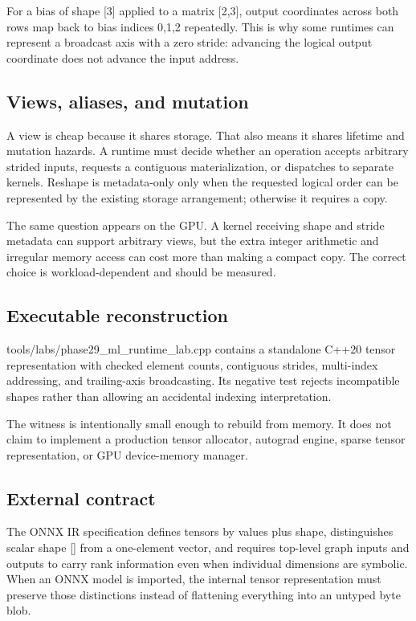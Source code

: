 For a bias of shape {[}3{]} applied to a matrix {[}2,3{]}, output coordinates across both rows map back to bias indices 0,1,2 repeatedly. This is why some runtimes can represent a broadcast axis with a zero stride: advancing the logical output coordinate does not advance the input address.

\subsection{Views, aliases, and mutation}\label{appendix-cebadf3106d1-views-aliases-and-mutation}

A view is cheap because it shares storage. That also means it shares lifetime and mutation hazards. A runtime must decide whether an operation accepts arbitrary strided inputs, requests a contiguous materialization, or dispatches to separate kernels. Reshape is metadata-only only when the requested logical order can be represented by the existing storage arrangement; otherwise it requires a copy.

The same question appears on the GPU. A kernel receiving shape and stride metadata can support arbitrary views, but the extra integer arithmetic and irregular memory access can cost more than making a compact copy. The correct choice is workload-dependent and should be measured.

\subsection{Executable reconstruction}\label{appendix-cebadf3106d1-executable-reconstruction}

tools/labs/phase29\_ml\_runtime\_lab.cpp contains a standalone C++20 tensor representation with checked element counts, contiguous strides, multi-index addressing, and trailing-axis broadcasting. Its negative test rejects incompatible shapes rather than allowing an accidental indexing interpretation.

The witness is intentionally small enough to rebuild from memory. It does not claim to implement a production tensor allocator, autograd engine, sparse tensor representation, or GPU device-memory manager.

\subsection{External contract}\label{appendix-cebadf3106d1-external-contract}

The ONNX IR specification defines tensors by values plus shape, distinguishes scalar shape {[}{]} from a one-element vector, and requires top-level graph inputs and outputs to carry rank information even when individual dimensions are symbolic. When an ONNX model is imported, the internal tensor representation must preserve those distinctions instead of flattening everything into an untyped byte blob.

